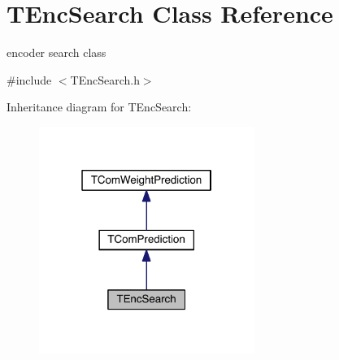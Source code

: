 \hypertarget{class_t_enc_search}{}\section{T\+Enc\+Search Class Reference}
\label{class_t_enc_search}


encoder search class  




{\ttfamily \#include $<$T\+Enc\+Search.\+h$>$}



Inheritance diagram for T\+Enc\+Search\+:
\nopagebreak
\begin{figure}[H]
\begin{center}
\leavevmode
\includegraphics[width=199pt]{d8/d70/class_t_enc_search__inherit__graph}
\end{center}
\end{figure}


